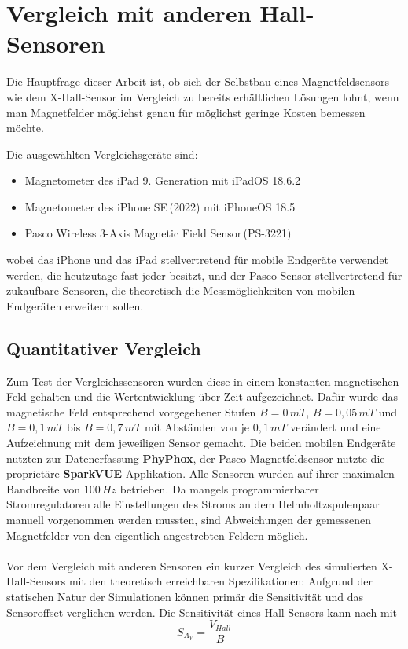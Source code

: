 \documentclass[12pt, a4paper]{article}
\begin{document}
\section{Vergleich mit anderen Hall-Sensoren}


Die Hauptfrage dieser Arbeit ist, ob sich der Selbstbau eines Magnetfeldsensors wie dem X-Hall-Sensor im Vergleich zu bereits erhältlichen Lösungen lohnt, wenn man Magnetfelder möglichst genau für möglichst geringe Kosten bemessen möchte. 
\pagebreak

{\raggedright 
Die ausgewählten Vergleichsgeräte sind:}
\begin{itemize}
	\item Magnetometer des iPad 9. Generation mit iPadOS 18.6.2
	\item Magnetometer des iPhone SE\,(2022) mit iPhoneOS 18.5
	\item Pasco Wireless 3-Axis Magnetic Field Sensor\,(PS-3221) 
\end{itemize} 
wobei das iPhone und das iPad stellvertretend für mobile Endgeräte verwendet werden, die heutzutage fast jeder besitzt, und der Pasco Sensor stellvertretend für zukaufbare Sensoren, die theoretisch die Messmöglichkeiten von mobilen Endgeräten erweitern sollen.

\subsection{Quantitativer Vergleich}
Zum Test der Vergleichssensoren wurden diese in einem konstanten magnetischen Feld gehalten und die Wertentwicklung über Zeit aufgezeichnet. Dafür wurde das magnetische Feld entsprechend vorgegebener Stufen $B=0\,mT$, $B=0,05\,mT$ und $B=0,1\,mT$ bis $B=0,7\,mT$ mit Abständen von je $0,1\,mT$ verändert und eine Aufzeichnung mit dem jeweiligen Sensor gemacht. Die beiden mobilen Endgeräte nutzten zur Datenerfassung \textbf{PhyPhox}, der Pasco Magnetfeldsensor nutzte die proprietäre \textbf{SparkVUE} Applikation. Alle Sensoren wurden auf ihrer maximalen Bandbreite von $100\,Hz$ betrieben.\newline
Da mangels programmierbarer Stromregulatoren alle Einstellungen des Stroms an dem Helmholtzspulenpaar manuell vorgenommen werden mussten, sind Abweichungen der gemessenen Magnetfelder von den eigentlich angestrebten Feldern möglich.\paragraph{}

Vor dem Vergleich mit anderen Sensoren ein kurzer Vergleich des simulierten X-Hall-Sensors mit den theoretisch erreichbaren Spezifikationen:\newline
Aufgrund der statischen Natur der Simulationen können primär die Sensitivität und das Sensoroffset verglichen werden. Die Sensitivität eines Hall-Sensors kann nach \cite{heidari15} mit 
\begin{equation}
	{S_{A_V}}=\frac{V_{Hall}}{B}
	\tag{5.1}
	\label{5.1}
\end{equation}
\end{document}
